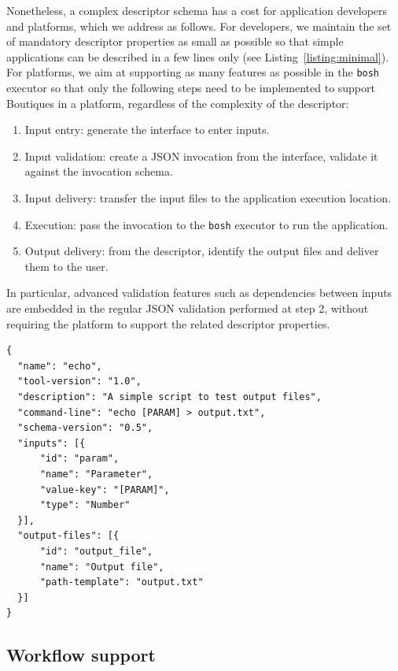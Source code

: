 \documentclass[a4paper,num-refs]{oup-contemporary}
\newcommand{\boutiques}{Boutiques\xspace}
\begin{document}
Nonetheless, a complex descriptor schema has a cost for application
developers and platforms, which we address as follows. For developers,
we maintain the set of mandatory descriptor properties as small as
possible so that simple applications can be described in a few lines
only (see Listing~\ref{listing:minimal}). For platforms, we aim at
supporting as many features as possible in the \texttt{bosh} executor
so that only the following steps need to be implemented to support
\boutiques in a platform, regardless of the complexity of the
descriptor:
\begin{enumerate}
  \item Input entry: generate the interface to enter inputs.
  \item Input validation: create a JSON invocation from the interface,
    validate it against the invocation schema.
  \item Input delivery: transfer the input files to the application
    execution location.
  \item Execution: pass the invocation to the \texttt{bosh} executor to run the application.
  \item Output delivery: from the descriptor, identify the output files
    and deliver them to the user.
\end{enumerate}
In particular, advanced validation features such as dependencies
between inputs are embedded in the regular JSON validation performed
at step 2, without requiring the platform to support the related
descriptor properties.
\begin{listing}
\begin{verbatim}
{
  "name": "echo",
  "tool-version": "1.0",
  "description": "A simple script to test output files",
  "command-line": "echo [PARAM] > output.txt",
  "schema-version": "0.5",
  "inputs": [{
      "id": "param",
      "name": "Parameter",
      "value-key": "[PARAM]",
      "type": "Number"
  }],
  "output-files": [{
      "id": "output_file",
      "name": "Output file",
      "path-template": "output.txt"
  }]
}
\end{verbatim}
\caption{A minimal \boutiques descriptor.} 
\label{listing:minimal}
\end{listing}

\subsection{Workflow support}
\end{document}
